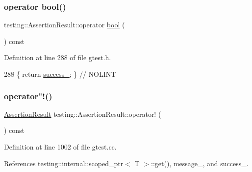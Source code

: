 \subsubsection{\texorpdfstring{operator bool()}{operator bool()}}
{\footnotesize\ttfamily testing\+::\+Assertion\+Result\+::operator \hyperlink{classbool}{bool} (\begin{DoxyParamCaption}{ }\end{DoxyParamCaption}) const\hspace{0.3cm}{\ttfamily [inline]}}



Definition at line 288 of file gtest.\+h.


\begin{DoxyCode}
288 \{ \textcolor{keywordflow}{return} \hyperlink{classtesting_1_1AssertionResult_ae7348f9fffe7a20980dfc94fc261d7ca}{success\_}; \}  \textcolor{comment}{// NOLINT}
\end{DoxyCode}
\mbox{\label{classtesting_1_1AssertionResult_a5b0784686a756660ac8dfe528d89386b}} 
\subsubsection{\texorpdfstring{operator"!()}{operator!()}}
{\footnotesize\ttfamily \hyperlink{classtesting_1_1AssertionResult}{Assertion\+Result} testing\+::\+Assertion\+Result\+::operator! (\begin{DoxyParamCaption}{ }\end{DoxyParamCaption}) const}



Definition at line 1002 of file gtest.\+cc.



References testing\+::internal\+::scoped\+\_\+ptr$<$ T $>$\+::get(), message\+\_\+, and success\+\_\+.



